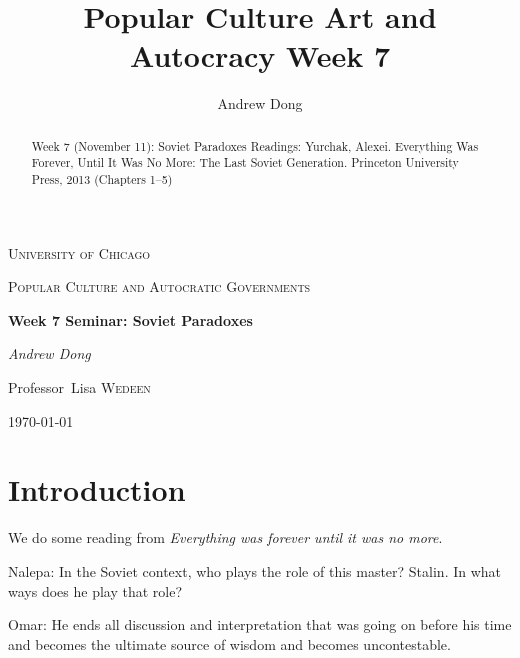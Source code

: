 \documentclass{article}
\begin{document}
\begin{titlepage}
	\centering
	{\scshape\LARGE University of Chicago \par}
	\vspace{1cm}
	{\scshape\Large Popular Culture and Autocratic Governments\par}
	\vspace{1.5cm}
	{\huge\bfseries Week 7 Seminar: Soviet Paradoxes \par}
	\vspace{1cm}
	{\Large\itshape Andrew Dong\par}
	\vspace{2cm}
	
	\vfill


\begin{abstract}
Week 7 (November 11): Soviet Paradoxes
Readings:
Yurchak, Alexei. Everything Was Forever, Until It Was No More: The Last Soviet Generation. Princeton University Press, 2013 (Chapters 1–5) 
\end{abstract}

\vfill

	Professor~Lisa \textsc{Wedeen}
	\vspace{5 mm}
	\\{\large \today\par}
\end{titlepage}

\title{Popular Culture Art and Autocracy Week 7}
\author{Andrew Dong}

\maketitle


\section{Introduction}

We do some reading from \textit{Everything was forever until it was no more}.  

\vspace{3mm}

Nalepa: In the Soviet context, who plays the role of this master?  Stalin.  In what ways does he play that role?  

\vspace{3mm}

Omar: He ends all discussion and interpretation that was going on before his time and becomes the ultimate source of wisdom and becomes uncontestable.  
\end{document}
